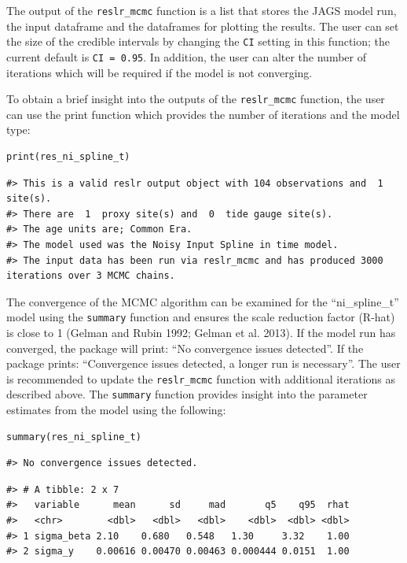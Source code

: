 \normalsize

The output of the \texttt{reslr\_mcmc} function is a list that stores the JAGS model run, the input dataframe and the dataframes for plotting the results. The user can set the size of the credible intervals by changing the \texttt{CI} setting in this function; the current default is \texttt{CI\ =\ 0.95}. In addition, the user can alter the number of iterations which will be required if the model is not converging.

To obtain a brief insight into the outputs of the \texttt{reslr\_mcmc} function, the user can use the print function which provides the number of iterations and the model type:
\scriptsize

\begin{verbatim}
print(res_ni_spline_t)
\end{verbatim}

\begin{verbatim}
#> This is a valid reslr output object with 104 observations and  1 site(s).
#> There are  1  proxy site(s) and  0  tide gauge site(s).
#> The age units are; Common Era. 
#> The model used was the Noisy Input Spline in time model.
#> The input data has been run via reslr_mcmc and has produced 3000 iterations over 3 MCMC chains.
\end{verbatim}

\normalsize

The convergence of the MCMC algorithm can be examined for the ``ni\_spline\_t'' model using the \texttt{summary} function and ensures the scale reduction factor (R-hat) is close to 1 (Gelman and Rubin 1992; Gelman et al. 2013). If the model run has converged, the package will print: ``No convergence issues detected''. If the package prints: ``Convergence issues detected, a longer run is necessary''. The user is recommended to update the \texttt{reslr\_mcmc} function with additional iterations as described above. The \texttt{summary} function provides insight into the parameter estimates from the model using the following:
\scriptsize

\begin{verbatim}
summary(res_ni_spline_t)
\end{verbatim}

\begin{verbatim}
#> No convergence issues detected.
\end{verbatim}

\begin{verbatim}
#> # A tibble: 2 x 7
#>   variable      mean      sd     mad       q5    q95  rhat
#>   <chr>        <dbl>   <dbl>   <dbl>    <dbl>  <dbl> <dbl>
#> 1 sigma_beta 2.10    0.680   0.548   1.30     3.32    1.00
#> 2 sigma_y    0.00616 0.00470 0.00463 0.000444 0.0151  1.00
\end{verbatim}

